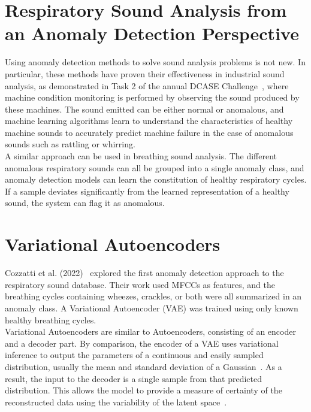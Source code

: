 \section{Respiratory Sound Analysis from an Anomaly Detection Perspective}
Using anomaly detection methods to solve sound analysis problems is not new. In particular, these methods have proven their effectiveness in industrial sound analysis, as demonstrated in Task 2 of the annual DCASE Challenge~\cite{dcaseDCASE2023Challenge}, where machine condition monitoring is performed by observing the sound produced by these machines. The sound emitted can be either normal or anomalous, and machine learning algorithms learn to understand the characteristics of healthy machine sounds to accurately predict machine failure in the case of anomalous sounds such as rattling or whirring.\\
A similar approach can be used in breathing sound analysis. The different anomalous respiratory sounds can all be grouped into a single anomaly class, and anomaly detection models can learn the constitution of healthy respiratory cycles. If a sample deviates significantly from the learned representation of a healthy sound, the system can flag it as anomalous.


\section{Variational Autoencoders}
Cozzatti et al. (2022)~\cite{cozzatti2022variational} explored the first anomaly detection approach to the respiratory sound database. Their work used MFCCs as features, and the breathing cycles containing wheezes, crackles, or both were all summarized in an anomaly class. A Variational Autoencoder (VAE) was trained using only known healthy breathing cycles.\\
Variational Autoencoders are similar to Autoencoders, consisting of an encoder and a decoder part. By comparison, the encoder of a VAE uses variational inference to output the parameters of a continuous and easily sampled distribution, usually the mean and standard deviation of a  Gaussian~\cite{cozzatti2022variational}. As a result, the input to the decoder is a single sample from that predicted distribution. This allows the model to provide a measure of certainty of the reconstructed data using the variability of the latent space~\cite{an2015variational}.\\


